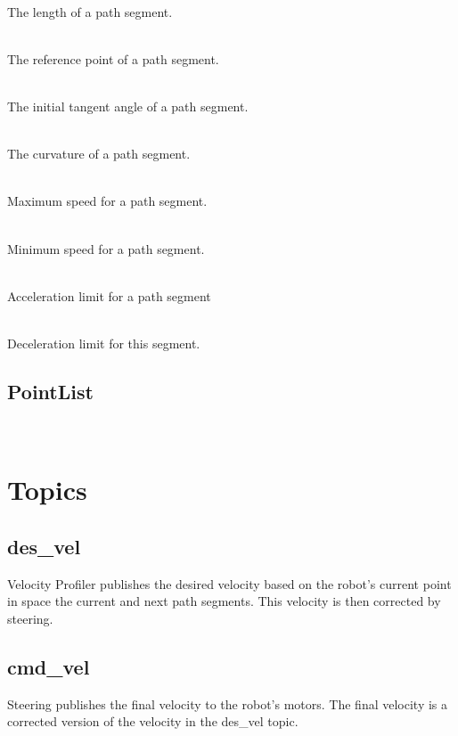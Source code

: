 \\
\indent The length of a path segment.

\\
\indent The reference point of a path segment.

\\
\indent The initial tangent angle of a path segment.

\\
\indent The curvature of a path segment.

\\
\indent Maximum speed for a path segment.

\\
\indent Minimum speed for a path segment.

\\
\indent Acceleration limit for a path segment 

\\
\indent Deceleration limit for this segment.

\subsection{PointList}
\\






\section{Topics}

\subsection{des\_vel}
Velocity Profiler publishes the desired velocity based on the robot's
current point in space the current and next path segments.  This
velocity is then corrected by steering.

\subsection{cmd\_vel}
Steering publishes the final velocity to the robot's motors.  The
final velocity is a corrected version of the velocity in the des\_vel topic.

